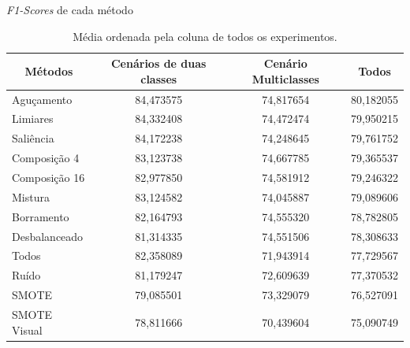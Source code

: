 \documentclass{beamer}
\begin{document}
\begin{frame}{\textit{F1-Scores} de cada método}
\setlength\leftmargini{0em}
  \begin{table}
  \centering
  \caption{Média ordenada pela coluna de todos os experimentos.}
  \footnotesize{
  \begin{tabular}{|l|c|c|c|}
  \hline
  \multicolumn{1}{|c|}{\textbf{Métodos}} & \textbf{Cenários de duas classes} & \textbf{Cenário Multiclasses} & \textbf{Todos} \\ \hline
  Aguçamento                             & 84,473575                         & 74,817654                     & 80,182055      \\ \hline
  Limiares                               & 84,332408                         & 74,472474                     & 79,950215      \\ \hline
  Saliência                              & 84,172238                         & 74,248645                     & 79,761752      \\ \hline
  Composição 4                           & 83,123738                         & 74,667785                     & 79,365537      \\ \hline
  Composição 16                          & 82,977850                         & 74,581912                     & 79,246322      \\ \hline
  Mistura                                & 83,124582                         & 74,045887                     & 79,089606      \\ \hline
  Borramento                             & 82,164793                         & 74,555320                     & 78,782805      \\ \hline
  Desbalanceado                          & 81,314335                         & 74,551506                     & 78,308633      \\ \hline
  Todos                                  & 82,358089                         & 71,943914                     & 77,729567      \\ \hline
  Ruído                                  & 81,179247                         & 72,609639                     & 77,370532      \\ \hline
  SMOTE                                  & 79,085501                         & 73,329079                     & 76,527091      \\ \hline
  SMOTE Visual                           & 78,811666                         & 70,439604                     & 75,090749      \\ \hline
  \end{tabular}
  }
  \end{table}
\end{frame}
\end{document}
